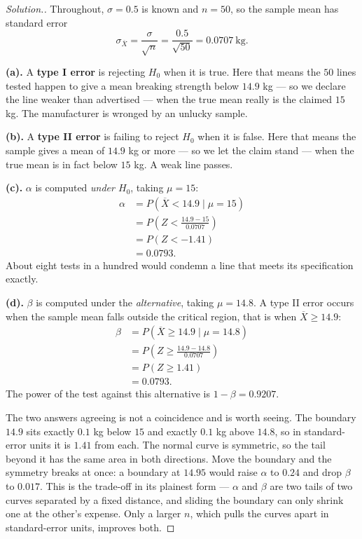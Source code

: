 \documentclass[11pt,a4paper]{article}
\theoremstyle{definition}
\newenvironment{solution}
  {\renewcommand{\qedsymbol}{}\begin{proof}[\textit{Solution}.]}
  {\end{proof}}
\begin{document}
\begin{solution}
Throughout, $\sigma=0.5$ is known and $n=50$, so the sample mean has standard error
\[\sigma_{\overline{X}}=\frac{\sigma}{\sqrt{n}}=\frac{0.5}{\sqrt{50}}=0.0707\ \text{kg}.\]

\textbf{(a).} A \textbf{type I error} is rejecting $H_0$ when it is true. Here that means
the $50$ lines tested happen to give a mean breaking strength below $14.9$ kg --- so we
declare the line weaker than advertised --- when the true mean really is the claimed $15$
kg. The manufacturer is wronged by an unlucky sample.

\textbf{(b).} A \textbf{type II error} is failing to reject $H_0$ when it is false. Here
that means the sample gives a mean of $14.9$ kg or more --- so we let the claim stand ---
when the true mean is in fact below $15$ kg. A weak line passes.

\textbf{(c).} $\alpha$ is computed \emph{under $H_0$}, taking $\mu=15$:
\begin{align*}
\alpha &=P(\overline{X}<14.9 \mid \mu=15)\\
       &=P\!\left(Z<\frac{14.9-15}{0.0707}\right)\\
       &=P(Z<-1.41)\\
       &=0.0793.
\end{align*}
About eight tests in a hundred would condemn a line that meets its specification exactly.

\textbf{(d).} $\beta$ is computed under the \emph{alternative}, taking $\mu=14.8$. A type II
error occurs when the sample mean falls outside the critical region, that is when
$\overline{X}\geq 14.9$:
\begin{align*}
\beta &=P(\overline{X}\geq 14.9 \mid \mu=14.8)\\
      &=P\!\left(Z\geq\frac{14.9-14.8}{0.0707}\right)\\
      &=P(Z\geq 1.41)\\
      &=0.0793.
\end{align*}
The power of the test against this alternative is $1-\beta=0.9207$.

The two answers agreeing is not a coincidence and is worth seeing. The boundary $14.9$ sits
exactly $0.1$ kg below $15$ and exactly $0.1$ kg above $14.8$, so in standard-error units it
is $1.41$ from each. The normal curve is symmetric, so the tail beyond it has the same area
in both directions. Move the boundary and the symmetry breaks at once: a boundary at $14.95$
would raise $\alpha$ to $0.24$ and drop $\beta$ to $0.017$. This is the trade-off in its
plainest form --- $\alpha$ and $\beta$ are two tails of two curves separated by a fixed
distance, and sliding the boundary can only shrink one at the other's expense. Only a larger
$n$, which pulls the curves apart in standard-error units, improves both.
\end{solution}
\end{document}
